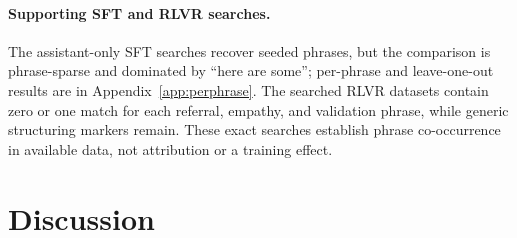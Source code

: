 \documentclass[11pt]{article}
\begin{document}
\begin{table}[t]
\centering
\small
\setlength{\tabcolsep}{2.5pt}
\caption{Aggregate DPO pair-level effects, unadjusted for within-pair length.
$\Delta$ pp is the absolute paired risk
difference in percentage points; MOR is chosen-only/rejected-only. $q$ is
Benjamini--Hochberg adjusted across eight exact McNemar tests. Confidence
intervals and descriptive per-word ratios are reported in the text and artifact.}
\label{tab:dpo}
\end{table}

\paragraph{Supporting SFT and RLVR searches.}
The assistant-only SFT searches recover seeded phrases, but the comparison is
phrase-sparse and dominated by ``here are some''; per-phrase and leave-one-out
results are in Appendix~\ref{app:perphrase}. The searched RLVR datasets contain
zero or one match for each referral, empathy, and validation phrase, while
generic structuring markers remain. These exact searches establish phrase
co-occurrence in available data, not attribution or a training effect.

\section{Discussion}
\end{document}
